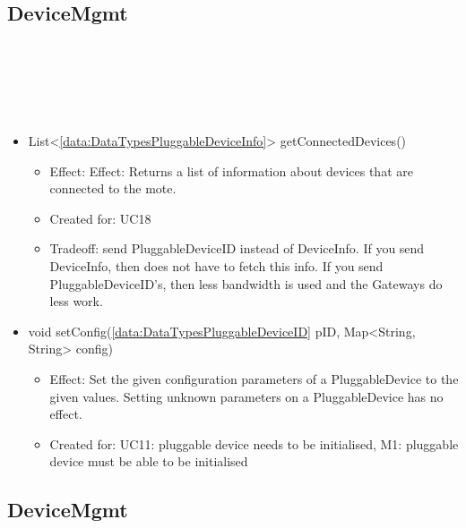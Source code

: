   \subsection{DeviceMgmt}\label{int:MoteMoteFacadeDeviceMgmt}
    \begin{description}
      \item[Provided by:] \iconcomponent{}~
      \item[Required by:] \iconcomponent{}~
      \item[Operations:] ~
    \begin{itemize}[noitemsep,nolistsep,leftmargin=-.25cm]
      \item \textsf{List\textless{}\ref{data:DataTypesPluggableDeviceInfo}\textgreater{} getConnectedDevices()}
        \begin{itemize}[noitemsep,nolistsep]
           \item Effect: Effect: Returns a list of information about devices that are connected to the mote.
\item Created for: UC18
\item Tradeoff: send PluggableDeviceID instead of DeviceInfo. If you send DeviceInfo, then  does not have to fetch this info. If you send PluggableDeviceID's, then less bandwidth is used and the Gateways do less work.
        \end{itemize}
      \item \textsf{void setConfig(\ref{data:DataTypesPluggableDeviceID} pID, Map\textless{}String, String\textgreater{} config)}
        \begin{itemize}[noitemsep,nolistsep]
           \item Effect: Set the given configuration parameters of a PluggableDevice to the given values. Setting unknown parameters on a PluggableDevice has no effect. \\
\item Created for: UC11: pluggable device needs to be initialised, M1: pluggable device must be able to be initialised
        \end{itemize}
    \end{itemize}
    \end{description}

  \subsection{DeviceMgmt}\label{int:OnlineServiceDeviceDBDeviceMgmt}
    \begin{description}
      \item[Provided by:] \iconcomponent{}~
      \item[Required by:] \iconcomponent{}~
      \item[Operations:] ~
    \end{description}

